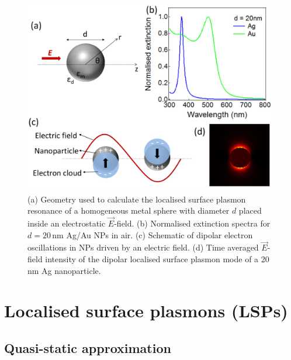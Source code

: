 \begin{figure}[h!] 
\centering    
\includegraphics[width=\textwidth]{Fig7}
\caption{(a) Geometry used to calculate the localised surface plasmon resonance of a homogeneous metal sphere with diameter $d$ placed inside an electrostatic $\vec{E}$-field. (b) Normalised extinction spectra for $d=20$\,nm Ag/Au NPs in air. (c) Schematic of dipolar electron oscillations in NPs driven by an electric field. (d) Time averaged $\vec{E}$-field intensity of the dipolar localised surface plasmon mode of a 20\,nm Ag nanoparticle.}
\label{3Fig7}
\end{figure} 
\section{Localised surface plasmons (LSPs)}
\subsection{Quasi-static approximation}

